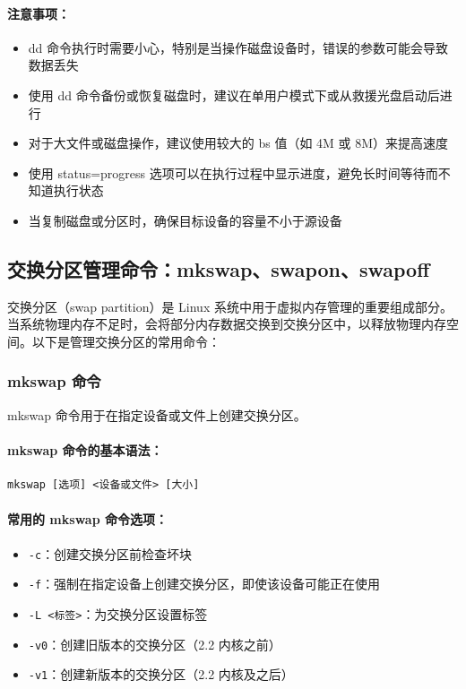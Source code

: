\documentclass[12pt,UTF8]{ctexbook}
\begin{document}
\paragraph{注意事项：}
\begin{itemize}
    \item dd 命令执行时需要小心，特别是当操作磁盘设备时，错误的参数可能会导致数据丢失
    \item 使用 dd 命令备份或恢复磁盘时，建议在单用户模式下或从救援光盘启动后进行
    \item 对于大文件或磁盘操作，建议使用较大的 bs 值（如 4M 或 8M）来提高速度
    \item 使用 status=progress 选项可以在执行过程中显示进度，避免长时间等待而不知道执行状态
    \item 当复制磁盘或分区时，确保目标设备的容量不小于源设备
\end{itemize}

\subsection{交换分区管理命令：mkswap、swapon、swapoff}
\label{swap\_commands}

交换分区（swap partition）是 Linux 系统中用于虚拟内存管理的重要组成部分。当系统物理内存不足时，会将部分内存数据交换到交换分区中，以释放物理内存空间。以下是管理交换分区的常用命令：

\subsubsection{mkswap 命令}
mkswap 命令用于在指定设备或文件上创建交换分区。

\paragraph{mkswap 命令的基本语法：}
\begin{verbatim}
mkswap [选项] <设备或文件> [大小]
\end{verbatim}

\paragraph{常用的 mkswap 命令选项：}
\begin{itemize}
    \item \verb+-c+：创建交换分区前检查坏块
    \item \verb+-f+：强制在指定设备上创建交换分区，即使该设备可能正在使用
    \item \verb+-L <标签>+：为交换分区设置标签
    \item \verb+-v0+：创建旧版本的交换分区（2.2 内核之前）
    \item \verb+-v1+：创建新版本的交换分区（2.2 内核及之后）
\end{itemize}
\end{document}
